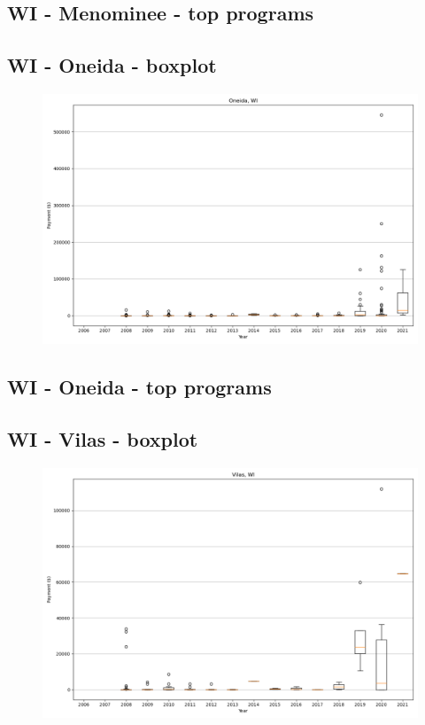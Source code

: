 \subsection*{WI - Menominee - top programs}

\newpage
\subsection*{WI - Oneida - boxplot}
\begin{figure}[h]
\centering
\includegraphics[width=7in]{../output/boxplots/counties/Oneida-WI_boxplot.png}
\end{figure}


\subsection*{WI - Oneida - top programs}

\newpage
\subsection*{WI - Vilas - boxplot}
\begin{figure}[h]
\centering
\includegraphics[width=7in]{../output/boxplots/counties/Vilas-WI_boxplot.png}
\end{figure}


